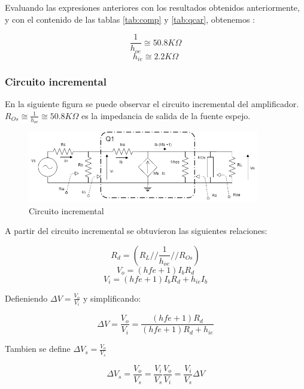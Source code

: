 \documentclass[../../main.tex]{subfiles}
\begin{document}
Evaluando las expresiones anteriores con los resultados obtenidos  anteriormente, y con el contenido de las tablas \ref{tab:comp} y \ref{tab:qcar}, obtenemos :

$$\frac{1}{h_{oe}}\cong 50.8K \Omega $$
$$ h_{ie}\cong 2.2K\Omega $$

\subsubsection{Circuito incremental}
En la siguiente figura se puede observar el circuito incremental del amplificador. $R_{Os}\cong \frac{1}{h_{oe}}\cong 50.8K \Omega  $ es la impedancia de salida de la fuente espejo. 
\begin{figure}[H]	
	\centering
	\includegraphics[width=0.9\textwidth]{imagenes/incr.png}
	\caption{Circuito incremental}
\end{figure}

A partir del circuito incremental se obtuvieron las siguientes relaciones:

\begin{equation}
R_d=\left( R_{L} // \frac{1}{h_{oe}} // R_{Os} \right)
\end{equation}
\begin{equation}
V_{o}=\left( h{fe} +1 \right) I_{b} R_d
\end{equation}
\begin{equation}
V_{i}=\left( h{fe} +1 \right) I_{b} R_d + h_{ie} I_{b} \label{eq:ri}
\end{equation}



Defieniendo $\Delta V =\frac{V_o}{V_i}$ y simplificando:

\begin{equation}
\Delta V =\frac{V_o}{V_i}=\frac{\left( h{fe} +1 \right) R_d}{\left( h{fe} +1 \right) R_d + h_{ie} }
\end{equation}

Tambien se define  $\Delta V_s =\frac{V_o}{V_s}$

\begin{equation}
\Delta V_s =\frac{V_o}{V_s}=\frac{V_i}{V_s} \frac{V_o}{V_i} =\frac{V_i}{V_s}\Delta V 
\end{equation}
\end{document}
